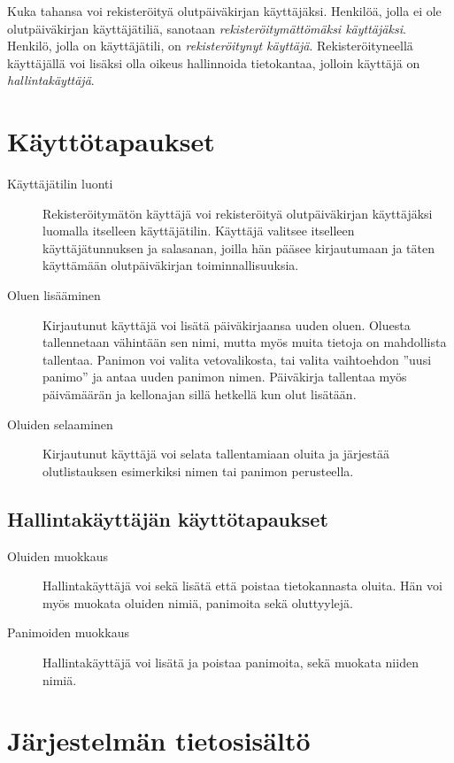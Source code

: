 \documentclass[12pt]{article}
\begin{document}
Kuka tahansa voi rekisteröityä olutpäiväkirjan käyttäjäksi. Henkilöä, jolla ei ole olutpäiväkirjan käyttäjätiliä, sanotaan \emph{rekisteröitymättömäksi käyttäjäksi}. Henkilö, jolla on käyttäjätili, on \emph{rekisteröitynyt käyttäjä}. Rekisteröityneellä käyttäjällä voi lisäksi olla oikeus hallinnoida tietokantaa, jolloin käyttäjä on \emph{hallintakäyttäjä}.

\section{Käyttötapaukset}

\begin{description}
\item[Käyttäjätilin luonti] Rekisteröitymätön käyttäjä voi rekisteröityä olutpäiväkirjan käyttäjäksi luomalla itselleen käyttäjätilin. Käyttäjä valitsee itselleen käyttäjätunnuksen ja salasanan, joilla hän pääsee kirjautumaan ja täten käyttämään olutpäiväkirjan toiminnallisuuksia.

\item[Oluen lisääminen] Kirjautunut käyttäjä voi lisätä päiväkirjaansa uuden oluen. Oluesta tallennetaan vähintään sen nimi, mutta myös muita tietoja on mahdollista tallentaa. Panimon voi valita vetovalikosta, tai valita vaihtoehdon ''uusi panimo'' ja antaa uuden panimon nimen. Päiväkirja tallentaa myös päivämäärän ja kellonajan sillä hetkellä kun olut lisätään.

\item[Oluiden selaaminen] Kirjautunut käyttäjä voi selata tallentamiaan oluita ja järjestää olutlistauksen esimerkiksi nimen tai panimon perusteella.
\end{description}

\subsection*{Hallintakäyttäjän käyttötapaukset}

\begin{description}
\item[Oluiden muokkaus] Hallintakäyttäjä voi sekä lisätä että poistaa tietokannasta oluita. Hän voi myös muokata oluiden nimiä, panimoita sekä oluttyylejä.

\item[Panimoiden muokkaus] Hallintakäyttäjä voi lisätä ja poistaa panimoita, sekä muokata niiden nimiä.
\end{description}

\section{Järjestelmän tietosisältö}
\end{document}
